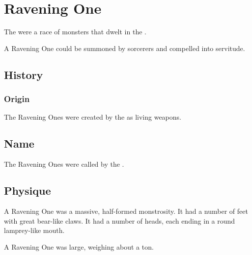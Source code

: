 \section{Ravening One}
The  were a race of monsters that dwelt in the \wylde. 

A Ravening One could be summoned by sorcerers and compelled into servitude.









\subsection{History}





\subsubsection{Origin}
The Ravening Ones were created by the \ophidians as living weapons.









\subsection{Name}
The Ravening Ones were called \emph{\rulyamoths} by the \ophidians.









\subsection{Physique}
A Ravening One was a massive, half-formed monstrosity. 
It had a number of feet with great bear-like claws.
It had a number of heads, each ending in a round lamprey-like mouth. 

A Ravening One was large, weighing about a ton. 









